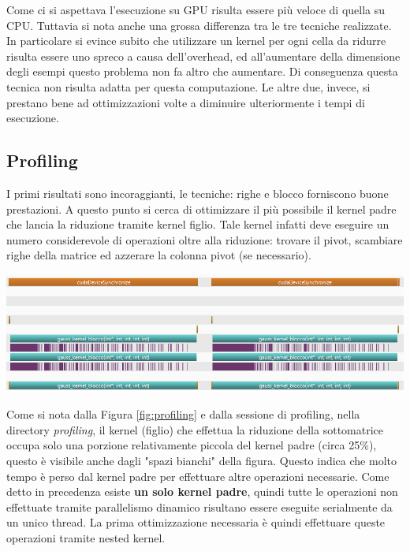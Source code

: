 \documentclass{article}
\begin{document}
Come ci si aspettava l'esecuzione su GPU risulta essere più veloce di quella su CPU. Tuttavia si nota anche una grossa differenza tra le tre tecniche realizzate. In particolare si evince subito che utilizzare un kernel per ogni cella da ridurre risulta essere uno spreco a causa dell'overhead, ed all'aumentare della dimensione degli esempi questo problema non fa altro che aumentare. Di conseguenza questa tecnica non risulta adatta per questa computazione. Le altre due, invece, si prestano bene ad ottimizzazioni volte a diminuire ulteriormente i tempi di esecuzione.

\subsection{Profiling}
I primi risultati sono incoraggianti, le tecniche: righe e blocco forniscono buone prestazioni. A questo punto si cerca di ottimizzare il più possibile il kernel padre che lancia la riduzione tramite kernel figlio. Tale kernel infatti deve eseguire un numero considerevole di operazioni oltre alla riduzione: trovare il pivot, scambiare righe della matrice ed azzerare la colonna pivot (se necessario). 
	\begin{center}
		\includegraphics[width = \textwidth]{profiling.png}
		\label{fig:profiling}
	\end{center}
	
Come si nota dalla Figura \ref{fig:profiling} e dalla sessione di profiling, nella directory \textit{profiling}, il kernel (figlio) che effettua la riduzione della sottomatrice occupa solo una porzione relativamente piccola del kernel padre (circa 25\%), questo è visibile anche dagli "spazi bianchi" della figura. Questo indica che molto tempo è perso dal kernel padre per effettuare altre operazioni necessarie. Come detto in precedenza esiste \textbf{un solo kernel padre}, quindi tutte le operazioni non effettuate tramite parallelismo dinamico risultano essere eseguite serialmente da un unico thread. La prima ottimizzazione necessaria è quindi effettuare queste operazioni tramite nested kernel.
\end{document}
